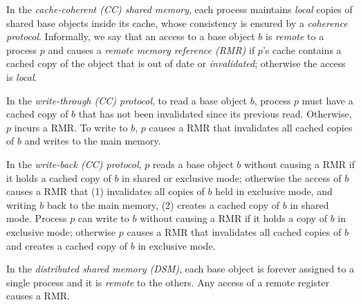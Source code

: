 In the \emph{cache-coherent (CC) shared memory}, each process maintains \emph{local}
copies of shared base objects inside its cache, whose consistency is ensured by a \emph{coherence protocol}.
Informally, we say that an access to a base object $b$ is \emph{remote} to a process $p$ and 
causes a \emph{remote memory reference (RMR)} if $p$'s cache contains a 
cached copy of the object that is out of date or \emph{invalidated}; otherwise the access is \emph{local}.

In the \emph{write-through (CC) protocol}, to read a base object $b$, process $p$ must have a cached copy of $b$ that
has not been invalidated since its previous read. Otherwise, $p$ incurs a RMR. 
To write to $b$, $p$ causes a RMR that invalidates all cached copies
of $b$ and writes to the main memory.

In the \emph{write-back (CC) protocol}, $p$ reads a base object $b$ without causing a RMR if it holds a cached copy of $b$
in shared or exclusive mode; otherwise the access of $b$ causes a RMR that (1) 
invalidates all copies of $b$ held in exclusive mode, and writing $b$ back to the main memory,
(2) creates a cached copy of $b$ in shared mode.
Process $p$ can write to $b$ without causing a RMR if it holds a copy of $b$ in exclusive mode; otherwise
$p$ causes a RMR that invalidates all cached copies of $b$ and creates a cached copy of $b$ in exclusive mode.

In the \emph{distributed shared memory (DSM)}, each base object is forever assigned to a single process and it is
\emph{remote} to the others. Any access of a remote register causes a RMR.
%
